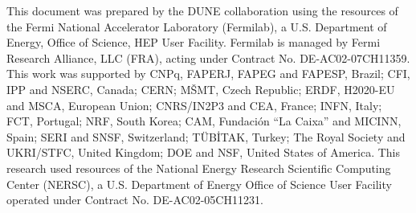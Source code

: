 \begin{acknowledgements}

This document was prepared by the DUNE collaboration using the
resources of the Fermi National Accelerator Laboratory
(Fermilab), a U.S. Department of Energy, Office of Science,
HEP User Facility. Fermilab is managed by Fermi Research Alliance,
LLC (FRA), acting under Contract No. DE-AC02-07CH11359.
This work was supported by
CNPq, FAPERJ, FAPEG and FAPESP,              Brazil;
CFI, IPP and NSERC,                          Canada;
CERN;
M\v{S}MT,                                        Czech Republic;
ERDF, H2020-EU and MSCA,                     European Union;
CNRS/IN2P3 and CEA,                          France;
INFN,                                        Italy;
FCT,                                         Portugal;
NRF,                                         South Korea;
CAM, Fundaci\'{o}n ``La Caixa'' and MICINN,  Spain;
SERI and SNSF,                               Switzerland;
T\"UB\.ITAK,                                 Turkey;
The Royal Society and UKRI/STFC,             United Kingdom;
DOE and NSF,                                 United States of America.
This research used resources of the
National Energy Research Scientific Computing Center (NERSC),
a U.S. Department of Energy Office of Science User Facility
operated under Contract No. DE-AC02-05CH11231.
\end{acknowledgements}
